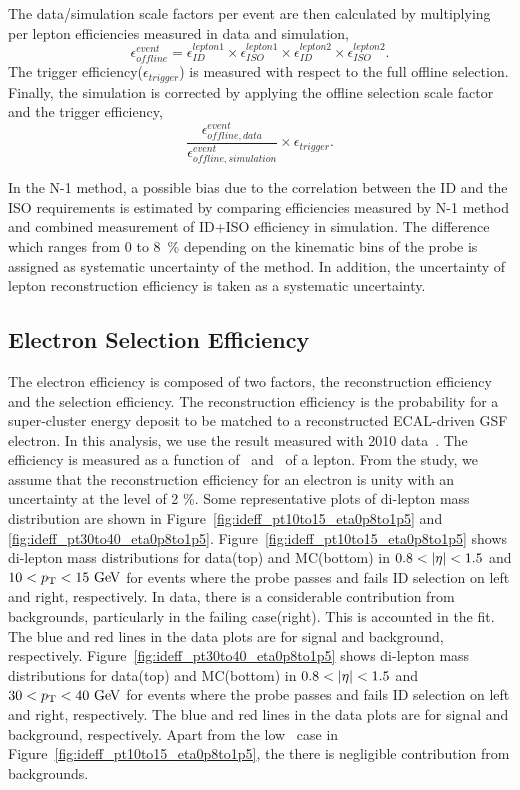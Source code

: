 The data/simulation scale factors per event are then calculated by 
multiplying per lepton efficiencies measured in data and simulation, 
\begin{equation} 
\epsilon_{offline}^{event} 
= 
\epsilon_{ID}^{lepton1} \times \epsilon_{ISO}^{lepton1}   
\times \epsilon_{ID}^{lepton2} \times \epsilon_{ISO}^{lepton2}.   
\end{equation} 
The trigger efficiency($\epsilon_{trigger}$) is measured with respect to the full 
offline selection. Finally, the simulation is corrected by applying the 
offline selection scale factor and the trigger efficiency, 
\begin{equation} 
\frac{\epsilon_{offline, data}^{event}}{\epsilon_{offline, simulation}^{event}} 
\times \epsilon_{trigger}. 
\end{equation} 

In the N-1 method, a possible bias due to the correlation between 
the ID and the ISO requirements is estimated by comparing efficiencies 
measured by N-1 method and combined measurement of ID+ISO efficiency in simulation. 
The difference which ranges from 0 to 8~\% depending 
on the kinematic bins of the probe is assigned as systematic uncertainty of the method.  
In addition, the uncertainty of lepton reconstruction efficiency is taken 
as a systematic uncertainty. 


\subsection{Electron Selection Efficiency}
\label{sec:electroneff}

The electron efficiency is composed of two factors, the reconstruction efficiency and 
the selection efficiency. The reconstruction efficiency is the probability for a 
super-cluster energy deposit to be matched to a reconstructed ECAL-driven 
GSF electron. In this analysis, we use the result measured with 2010 
data~\cite{Khachatryan:2010xn}.  
The efficiency is measured as a function 
of \pt~and \Eta~of a lepton. From the study, we assume that the reconstruction 
efficiency for an electron is unity with an uncertainty at the level of 2 \%.
Some representative plots of di-lepton mass distribution are shown in 
Figure~\ref{fig:ideff_pt10to15_eta0p8to1p5} and \ref{fig:ideff_pt30to40_eta0p8to1p5}. 
Figure~\ref{fig:ideff_pt10to15_eta0p8to1p5} shows di-lepton mass distributions 
for data(top) and MC(bottom) in $0.8<|\Eta|<1.5$ and $10 < p_\mathrm{T} < 15~\mathrm{Ge\kern -0.1em V}$ for events 
where the probe passes and fails ID selection on left and right, 
respectively. In data, there is a considerable contribution from backgrounds, 
particularly in the failing case(right). This is accounted in the fit. 
The blue and red lines in the data plots are for signal and background, respectively. 
Figure~\ref{fig:ideff_pt30to40_eta0p8to1p5} shows  
di-lepton mass distributions for data(top) and MC(bottom) 
in $0.8<|\Eta|<1.5$ and $30 < p_\mathrm{T} < 40~\mathrm{Ge\kern -0.1em V}$ for events 
where the probe passes and fails ID selection on left and right, 
respectively. The blue and red lines in the data plots 
are for signal and background, respectively. Apart from 
the low \pt\ case in Figure~\ref{fig:ideff_pt10to15_eta0p8to1p5}, 
the there is negligible contribution from backgrounds. 

